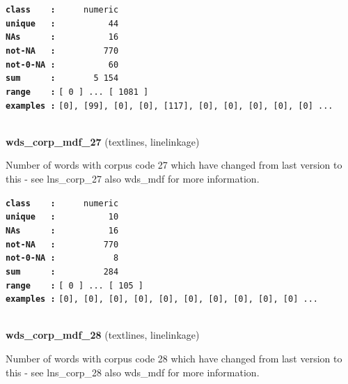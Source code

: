 \documentclass[]{article}
\begin{document}
\textbf{\texttt{class\ \ \ \ :}} \texttt{~~~~~numeric}\\
\textbf{\texttt{unique\ \ \ :}} \texttt{~~~~~~~~~~44}\\
\textbf{\texttt{NAs\ \ \ \ \ \ :}} \texttt{~~~~~~~~~~16}\\
\textbf{\texttt{not-NA\ \ \ :}} \texttt{~~~~~~~~~770}\\
\textbf{\texttt{not-0-NA\ :}} \texttt{~~~~~~~~~~60}\\
\textbf{\texttt{sum\ \ \ \ \ \ :}} \texttt{~~~~~~~5~154}\\
\textbf{\texttt{range\ \ \ \ :}}
\texttt{{[}\ 0\ {]}\ ...\ {[}\ 1081\ {]}}\\
\textbf{\texttt{examples\ :}}
\texttt{{[}0{]},\ {[}99{]},\ {[}0{]},\ {[}0{]},\ {[}117{]},\ {[}0{]},\ {[}0{]},\ {[}0{]},\ {[}0{]},\ {[}0{]}\ ...}\\

~

\textbf{wds\_corp\_mdf\_27} (textlines, linelinkage)

Number of words with corpus code 27 which have changed from last version
to this - see lns\_corp\_27 also wds\_mdf for more information.

\textbf{\texttt{class\ \ \ \ :}} \texttt{~~~~~numeric}\\
\textbf{\texttt{unique\ \ \ :}} \texttt{~~~~~~~~~~10}\\
\textbf{\texttt{NAs\ \ \ \ \ \ :}} \texttt{~~~~~~~~~~16}\\
\textbf{\texttt{not-NA\ \ \ :}} \texttt{~~~~~~~~~770}\\
\textbf{\texttt{not-0-NA\ :}} \texttt{~~~~~~~~~~~8}\\
\textbf{\texttt{sum\ \ \ \ \ \ :}} \texttt{~~~~~~~~~284}\\
\textbf{\texttt{range\ \ \ \ :}}
\texttt{{[}\ 0\ {]}\ ...\ {[}\ 105\ {]}}\\
\textbf{\texttt{examples\ :}}
\texttt{{[}0{]},\ {[}0{]},\ {[}0{]},\ {[}0{]},\ {[}0{]},\ {[}0{]},\ {[}0{]},\ {[}0{]},\ {[}0{]},\ {[}0{]}\ ...}\\

~

\textbf{wds\_corp\_mdf\_28} (textlines, linelinkage)

Number of words with corpus code 28 which have changed from last version
to this - see lns\_corp\_28 also wds\_mdf for more information.
\end{document}

